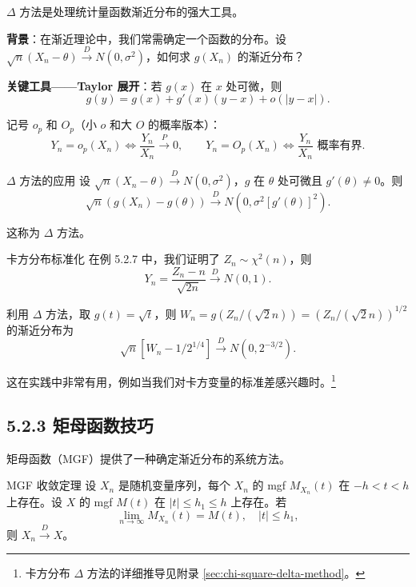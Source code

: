 $\Delta$ 方法是处理统计量函数渐近分布的强大工具。

\textbf{背景}：在渐近理论中，我们常需确定一个函数的分布。设 $\sqrt{n}(X_n - \theta) \xrightarrow{D} N(0, \sigma^2)$，如何求 $g(X_n)$ 的渐近分布？

\textbf{关键工具——Taylor 展开}：若 $g(x)$ 在 $x$ 处可微，则
\[
g(y) = g(x) + g'(x)(y-x) + o(|y-x|).
\label{eq:taylor-expansion}
\]

记号 $o_p$ 和 $O_p$（小 $o$ 和大 $O$ 的概率版本）：
\[
Y_n = o_p(X_n) \iff \frac{Y_n}{X_n} \xrightarrow{P} 0,\qquad
Y_n = O_p(X_n) \iff \frac{Y_n}{X_n} \text{ 概率有界}.
\label{eq:op-notation}
\]

\begin{example}{$\Delta$ 方法的应用}\label{ex:delta-method-example}
设 $\sqrt{n}(X_n - \theta) \xrightarrow{D} N(0, \sigma^2)$，$g$ 在 $\theta$ 处可微且 $g'(\theta) \neq 0$。则
\[
\sqrt{n}(g(X_n) - g(\theta)) \xrightarrow{D} N(0, \sigma^2 [g'(\theta)]^2).
\label{eq:delta-method-result}
\]

这称为 $\Delta$ 方法。%
\end{example}

\begin{example}{卡方分布标准化}\label{ex:chi-square-standardized}
在例 5.2.7 中，我们证明了 $Z_n \sim \chi^2(n)$，则
\[
Y_n = \frac{Z_n - n}{\sqrt{2n}} \xrightarrow{D} N(0,1).
\label{eq:chi-square-standardized}
\]

利用 $\Delta$ 方法，取 $g(t) = \sqrt{t}$，则 $W_n = g(Z_n/(\sqrt{2}n)) = (Z_n/(\sqrt{2}n))^{1/2}$ 的渐近分布为
\[
\sqrt{n}[W_n - 1/2^{1/4}] \xrightarrow{D} N(0, 2^{-3/2}).
\label{eq:chi-square-delta-method}
\]

这在实践中非常有用，例如当我们对卡方变量的标准差感兴趣时。\footnote{卡方分布 $\Delta$ 方法的详细推导见附录 \cref{sec:chi-square-delta-method}。}
\end{example}

\subsection{5.2.3 矩母函数技巧}

矩母函数（MGF）提供了一种确定渐近分布的系统方法。

\begin{theorem}{MGF 收敛定理}\label{th:mgf-convergence}
设 ${X_n}$ 是随机变量序列，每个 $X_n$ 的 mgf $M_{X_n}(t)$ 在 $-h < t < h$ 上存在。设 $X$ 的 mgf $M(t)$ 在 $|t| \leq h_1 \leq h$ 上存在。若
\[
\lim_{n \to \infty} M_{X_n}(t) = M(t),\quad |t| \leq h_1,
\]
则 $X_n \xrightarrow{D} X$。
\end{theorem}

